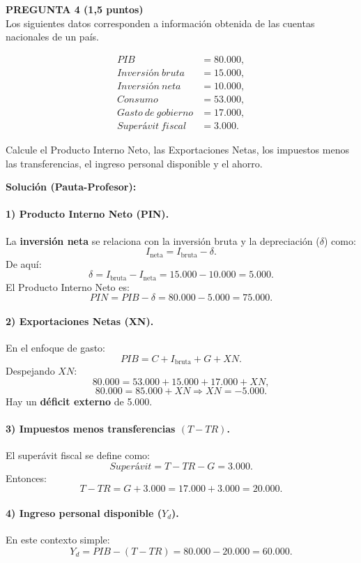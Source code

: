 \documentclass[11pt,addpoints]{article}
\begin{document}
\newpage
\vspace*{0.5cm}
\textbf{PREGUNTA 4 (1,5 puntos)}\\[0.2cm]
Los siguientes datos corresponden a información obtenida de las cuentas nacionales de un país.

\begin{align*}
PIB &= 80{.}000, \\
Inversión\ bruta &= 15{.}000, \\
Inversión\ neta &= 10{.}000, \\
Consumo &= 53{.}000, \\
Gasto\ de\ gobierno &= 17{.}000, \\
Superávit\ fiscal &= 3{.}000.
\end{align*}

Calcule el Producto Interno Neto, las Exportaciones Netas, los impuestos menos las transferencias, el ingreso personal disponible y el ahorro.

\vspace{0.2cm}
\textbf{Solución (Pauta-Profesor):}

\paragraph{1) Producto Interno Neto (PIN).}
La \textbf{inversión neta} se relaciona con la inversión bruta y la depreciación ($\delta$) como:
\[
I_{\text{neta}} = I_{\text{bruta}} - \delta.
\]
De aquí:
\[
\delta = I_{\text{bruta}} - I_{\text{neta}} = 15{.}000 - 10{.}000 = 5{.}000.
\]
El Producto Interno Neto es:
\[
PIN = PIB - \delta = 80{.}000 - 5{.}000 = 75{.}000.
\]

\paragraph{2) Exportaciones Netas (XN).}
En el enfoque de gasto:
\[
PIB = C + I_{\text{bruta}} + G + XN.
\]
Despejando $XN$:
\[
80{.}000 = 53{.}000 + 15{.}000 + 17{.}000 + XN,
\]
\[
80{.}000 = 85{.}000 + XN \Rightarrow XN = -5{.}000.
\]
Hay un \textbf{déficit externo} de 5.000.

\paragraph{3) Impuestos menos transferencias $(T - TR)$.}
El superávit fiscal se define como:
\[
Superávit = T - TR - G = 3{.}000.
\]
Entonces:
\[
T - TR = G + 3{.}000 = 17{.}000 + 3{.}000 = 20{.}000.
\]

\paragraph{4) Ingreso personal disponible ($Y_d$).}
En este contexto simple:
\[
Y_d = PIB - (T - TR) = 80{.}000 - 20{.}000 = 60{.}000.
\]
\end{document}
